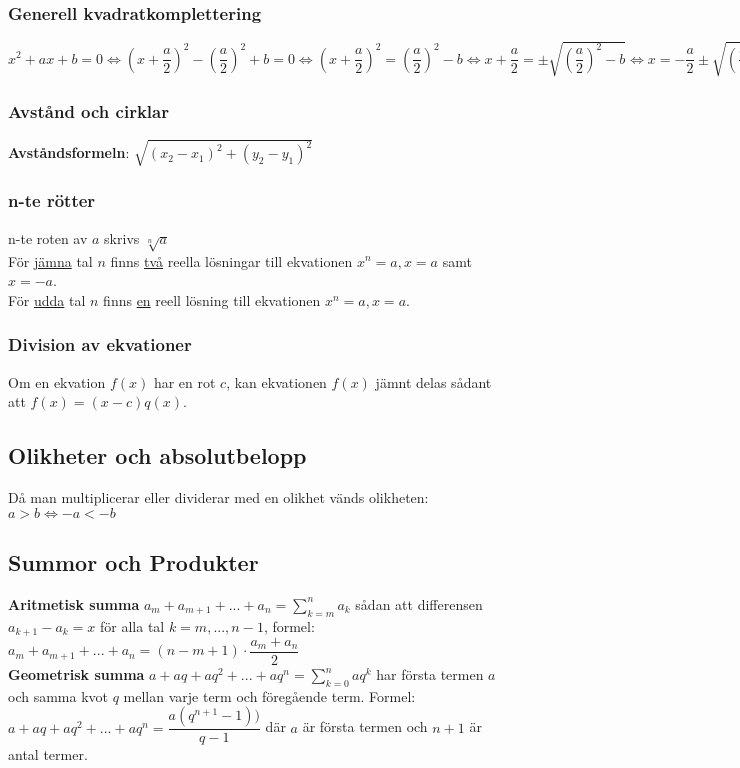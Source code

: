 \documentclass{article}
\begin{document}
\subsubsection{Generell kvadratkomplettering}
$x^2 + ax + b = 0 \Leftrightarrow  (x + \dfrac{a}{2})^2 - (\dfrac{a}{2})^2 + b = 0 \Leftrightarrow (x + \dfrac{a}{2})^2 = (\dfrac{a}{2})^2 - b \Leftrightarrow x + \dfrac{a}{2} = \pm \sqrt{(\dfrac{a}{2})^2 - b} \Leftrightarrow x = -\dfrac{a}{2} \pm \sqrt{(\dfrac{a}{2})^2 - b} $

\subsubsection{Avstånd och cirklar}
\textbf{Avståndsformeln}: $\sqrt{(x_2 - x_1)^2 + (y_2 - y_1)^2} $

\subsubsection {n-te rötter}
n-te roten av $a$ skrivs $\sqrt[n]{a}$\\
För \underline{jämna} tal $n$ finns \underline{två} reella lösningar till ekvationen $x^n = a, x = a$ samt $x = -a$.\\
För \underline{udda} tal $n$ finns \underline{en} reell lösning till ekvationen $x^n = a, x = a$.\\

\subsubsection{Division av ekvationer}
Om en ekvation $f(x)$ har en rot $c$, kan ekvationen $f(x)$  jämnt delas sådant att $f(x) = (x - c)q(x)$.

\subsection{Olikheter och absolutbelopp}
Då man multiplicerar eller dividerar med en olikhet vänds olikheten: $a > b \Leftrightarrow -a < -b$

\subsection{Summor och Produkter}
\textbf{Aritmetisk summa} $a_m + a_{m+1} + ... + a_n = \sum\limits_{k = m}^n a_k$ sådan att differensen $a_{k+1} - a_k = x$ för alla tal $k = m, ..., n-1$, formel: $a_m + a_{m+1} + ... + a_n = (n  - m + 1) \cdot \dfrac{a_m + a_n}{2}$ \\
\textbf{Geometrisk summa} $a + aq + aq^2 + ... + aq^n = \sum\limits_{k = 0}^n aq^k$ har första termen $a$ och samma kvot $q$ mellan varje term och föregående term. Formel: $a + aq + aq^2 + ... + aq^n = \dfrac{a(q^{n+1} - 1))}{q - 1}$ där $a$ är första termen och $n + 1$ är antal termer.
\end{document}

